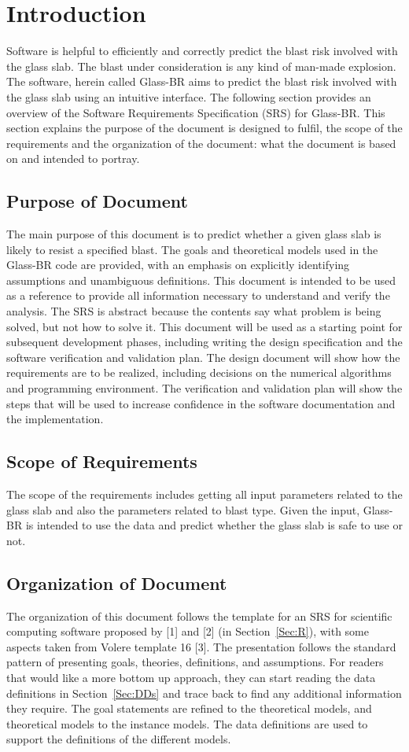 \documentclass[12pt]{article}
\begin{document}
\section{Introduction}
\label{Sec:I}
Software is helpful to efficiently and correctly predict the blast risk involved with the glass slab. The blast under consideration is any kind of man-made explosion. The software, herein called Glass-BR aims to predict the blast risk involved with the glass slab using an intuitive interface. The following section provides an overview of the Software Requirements Specification (SRS) for Glass-BR. This section explains the purpose of the document is designed to fulfil, the scope of the requirements and the organization of the document: what the document is based on and intended to portray.
\subsection{Purpose of Document}
\label{Sec:PoD}
The main purpose of this document is to predict whether a given glass slab is likely to resist a specified blast. The goals and theoretical models used in the Glass-BR code are provided, with an emphasis on explicitly identifying assumptions and unambiguous definitions. This document is intended to be used as a reference to provide all information necessary to understand and verify the analysis. The SRS is abstract because the contents say what problem is being solved, but not how to solve it.
This document will be used as a starting point for subsequent development phases, including writing the design specification and the software verification and validation plan. The design document will show how the requirements are to be realized, including decisions on the numerical algorithms and programming environment. The verification and validation plan will show the steps that will be used to increase confidence in the software documentation and the implementation.
\subsection{Scope of Requirements}
\label{Sec:SoRs}
The scope of the requirements includes getting all input parameters related to the glass slab and also the parameters related to blast type. Given the input, Glass-BR is intended to use the data and predict whether the glass slab is safe to use or not.
\subsection{Organization of Document}
\label{Sec:OoD}
The organization of this document follows the template for an SRS for scientific computing software proposed by [1] and [2] (in Section~\ref{Sec:R}), with some aspects taken from Volere template 16 [3]. The presentation follows the standard pattern of presenting goals, theories, definitions, and assumptions. For readers that would like a more bottom up approach, they can start reading the data definitions in Section~\ref{Sec:DDs} and trace back to find any additional information they require.
The goal statements are refined to the theoretical models, and theoretical models to the instance models. The data definitions are used to support the definitions of the different models.
\end{document}
